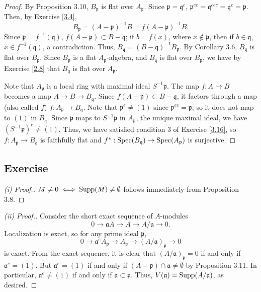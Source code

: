 \begin{proof}
By Proposition 3.10, $B_{\mathfrak{p}}$ is flat over $A_{\mathfrak{p}}$. Since $\mathfrak{p} = \mathfrak{q}^c$, $\mathfrak{p}^{ec} = \mathfrak{q}^{cec} = \mathfrak{q}^c = \mathfrak{p}$. Then, by Exercise \ref{3.4},
$$B_{\mathfrak{p}} = (A - \mathfrak{p})^{-1}B = f(A - \mathfrak{p})^{-1}B.$$
Since $\mathfrak{p} = f^{-1}(\mathfrak{q})$, $f(A - \mathfrak{p}) \subset B - \mathfrak{q}$; if $b = f(x)$, where $x \not\in \mathfrak{p}$, then if $b \in \mathfrak{q}$, $x \in f^{-1}(\mathfrak{q})$, a contradiction.
Thus, $B_{\mathfrak{q}} = (B-\mathfrak{q})^{-1}B_{\mathfrak{p}}$. By Corollary 3.6, $B_{\mathfrak{q}}$ is flat over $B_{\mathfrak{p}}$. Since $B_{\mathfrak{p}}$ is a flat $A_{\mathfrak{p}}$-algebra, and $B_{\mathfrak{q}}$
is flat over $B_{\mathfrak{p}}$, we have by Exercise \ref{2.8} that $B_{\mathfrak{q}}$ is flat over $A_{\mathfrak{p}}$.

Note that $A_{\mathfrak{p}}$ is a local ring with maximal ideal $S^{-1}\mathfrak{p}$. The map $f : A \to B$ becomes a map $A \to B \to B_{\mathfrak{q}}$. Since $f(A-\mathfrak{p}) \subset B-\mathfrak{q}$, it factors through
a map (also called $f$) $f : A_{\mathfrak{p}} \to B_{\mathfrak{q}}$. Note that $\mathfrak{p}^e \neq (1)$ since $\mathfrak{p}^{ec} = \mathfrak{p}$, so it does not map to $(1)$ in $B_{\mathfrak{q}}$. Since $\mathfrak{p}$ maps
to $S^{-1}\mathfrak{p}$ in $A_{\mathfrak{p}}$, the unique maximal ideal, we have $(S^{-1}\mathfrak{p})^e \neq (1)$. Thus, we have satisfied condition 3 of Exercise \ref{3.16}, so $f : A_{\mathfrak{p}} \to B_{\mathfrak{q}}$
is faithfully flat and $f^* : \operatorname{Spec}(B_{\mathfrak{q}}) \to \operatorname{Spec}(A_{\mathfrak{p}})$ is surjective.
\end{proof}

\subsection{Exercise}\label{3.19}

\begin{proof}[(i) Proof.]
$M \neq 0 \iff \operatorname{Supp}(M) \neq \emptyset$ follows immediately from Proposition 3.8.
\end{proof}

\begin{proof}[(ii) Proof.]
Consider the short exact sequence of $A$-modules
$$0 \to \mathfrak{a}A \to A \to A/\mathfrak{a} \to 0.$$
Localization is exact, so for any prime ideal $\mathfrak{p}$,
$$0 \to \mathfrak{a}^eA_{\mathfrak{p}} \to A_{\mathfrak{p}} \to (A/\mathfrak{a})_{\mathfrak{p}} \to 0$$
is exact. From the exact sequence, it is clear that $(A/\mathfrak{a})_{\mathfrak{p}} = 0$ if and only if $\mathfrak{a}^e = (1)$. But $\mathfrak{a}^e = (1)$ if and only if 
$(A - \mathfrak{p}) \cap \mathfrak{a} \neq \emptyset$ by Proposition 3.11. In particular, $\mathfrak{a}^e \neq (1)$ if and only if $\mathfrak{a} \subset \mathfrak{p}$. Thus, 
$V(\mathfrak{a}) = \operatorname{Supp}(A/\mathfrak{a})$, as desired.
\end{proof}

